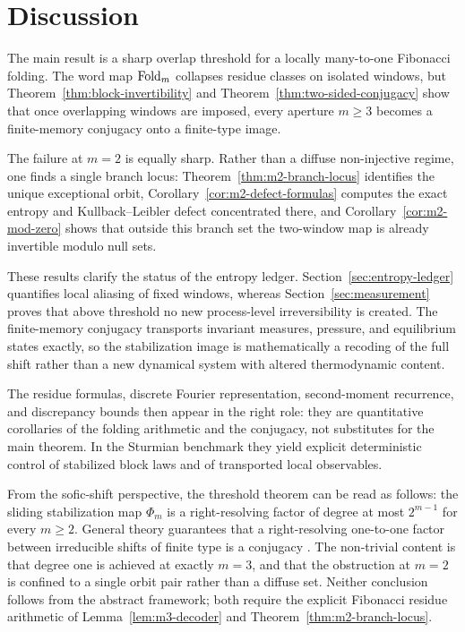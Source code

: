 \section{Discussion}\label{sec:discussion}

The main result is a sharp overlap threshold for a locally many-to-one Fibonacci folding. The word map $\mathrm{Fold}_m$ collapses residue classes on isolated windows, but Theorem~\ref{thm:block-invertibility} and Theorem~\ref{thm:two-sided-conjugacy} show that once overlapping windows are imposed, every aperture $m\ge 3$ becomes a finite-memory conjugacy onto a finite-type image.

The failure at $m=2$ is equally sharp. Rather than a diffuse non-injective regime, one finds a single branch locus: Theorem~\ref{thm:m2-branch-locus} identifies the unique exceptional orbit, Corollary~\ref{cor:m2-defect-formulas} computes the exact entropy and Kullback--Leibler defect concentrated there, and Corollary~\ref{cor:m2-mod-zero} shows that outside this branch set the two-window map is already invertible modulo null sets.

These results clarify the status of the entropy ledger. Section~\ref{sec:entropy-ledger} quantifies local aliasing of fixed windows, whereas Section~\ref{sec:measurement} proves that above threshold no new process-level irreversibility is created. The finite-memory conjugacy transports invariant measures, pressure, and equilibrium states exactly, so the stabilization image is mathematically a recoding of the full shift rather than a new dynamical system with altered thermodynamic content.

The residue formulas, discrete Fourier representation, second-moment recurrence, and discrepancy bounds then appear in the right role: they are quantitative corollaries of the folding arithmetic and the conjugacy, not substitutes for the main theorem. In the Sturmian benchmark they yield explicit deterministic control of stabilized block laws and of transported local observables.

From the sofic-shift perspective, the threshold theorem can be read as follows: the sliding stabilization map $\Phi_m$ is a right-resolving factor of degree at most $2^{m-1}$ for every $m\ge 2$. General theory guarantees that a right-resolving one-to-one factor between irreducible shifts of finite type is a conjugacy \cite{Ashley1988,LindMarcus1995}. The non-trivial content is that degree one is achieved at exactly $m=3$, and that the obstruction at $m=2$ is confined to a single orbit pair rather than a diffuse set. Neither conclusion follows from the abstract framework; both require the explicit Fibonacci residue arithmetic of Lemma~\ref{lem:m3-decoder} and Theorem~\ref{thm:m2-branch-locus}.

